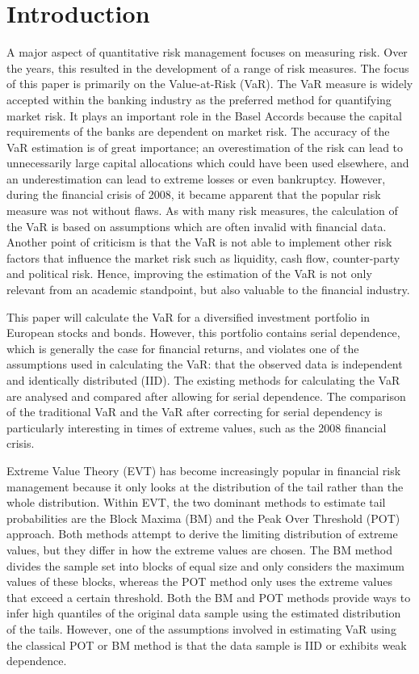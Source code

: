\documentclass[a4paper,12pt]{article}
\theoremstyle{plain}
\begin{document}
\newpage
{}
\tableofcontents
\newpage

\section{Introduction}
A major aspect of quantitative risk management focuses on measuring risk. Over the years, this resulted in the development of a range of risk measures. The focus of this paper is primarily on the Value-at-Risk (VaR). The VaR measure is widely accepted within the banking industry as the preferred method for quantifying market risk. It plays an important role in the Basel Accords because the capital requirements of the banks are dependent on market risk. The accuracy of the VaR estimation is of great importance; an overestimation of the risk can lead to unnecessarily large capital allocations which could have been used elsewhere, and an underestimation can lead to extreme losses or even bankruptcy. However, during the financial crisis of 2008, it became apparent that the popular risk measure was not without flaws. As with many risk measures, the calculation of the VaR is based on assumptions which are often invalid with financial data. Another point of criticism is that the VaR is not able to implement other risk factors that influence the market risk such as liquidity, cash flow, counter-party and political risk. Hence, improving the estimation of the VaR is not only relevant from an academic standpoint, but also valuable to the financial industry. \newline

This paper will calculate the VaR for a diversified investment portfolio in European stocks and bonds. However, this portfolio contains serial dependence, which is generally the case for financial returns, and violates one of the assumptions used in calculating the VaR: that the observed data is independent and identically distributed (IID). The existing methods for calculating the VaR are analysed and compared after allowing for serial dependence. The comparison of the traditional VaR and the VaR after correcting for serial dependency is particularly interesting in times of extreme values, such as the 2008 financial crisis. \newline

Extreme Value Theory (EVT) has become increasingly popular in financial risk management because it only looks at the distribution of the tail rather than the whole distribution. Within EVT, the two dominant methods to estimate tail probabilities are the Block Maxima (BM) and the Peak Over Threshold (POT) approach. Both methods attempt to derive the limiting distribution of extreme values, but they differ in how the extreme values are chosen. The BM method divides the sample set into blocks of equal size and only considers the maximum values of these blocks, whereas the POT method only uses the extreme values that exceed a certain threshold. Both the BM and POT methods provide ways to infer high quantiles of the original data sample using the estimated distribution of the tails. However, one of the assumptions involved in estimating VaR using the classical POT or BM method is that the data sample is IID or exhibits weak dependence.\\
\end{document}
